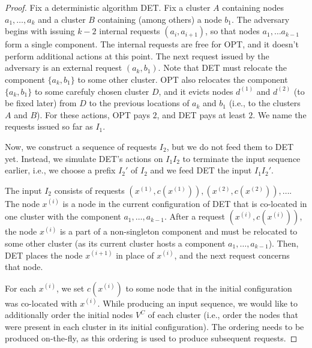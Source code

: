 \begin{proof}


  Fix a deterministic algorithm DET.
  Fix a cluster $A$ containing nodes $a_1, \ldots, a_k$ and a cluster $B$ containing (among others) a node $b_1$.
  The adversary begins with issuing $k-2$ internal requests $(a_i, a_{i+1})$, so that nodes $a_1, \ldots a_{k-1}$ form a single component.
  The internal requests are free for OPT, and it doesn't perform additional actions at this point.
  The next request issued by the adversary is an external request $(a_k, b_1)$.%
  Note that DET must relocate the component $\{a_k, b_1\}$ to some other cluster.
  OPT also relocates the component $\{a_k, b_1\}$ to some carefuly chosen cluster $D$, and it evicts nodes $d^{(1)}$ and $d^{(2)}$ (to be fixed later) from $D$ to the previous locations of $a_k$ and $b_1$ (i.e., to the clusters $A$ and $B$).
  For these actions, OPT pays $2$, and DET pays at least $2$.
  We name the requests issued so far as $I_1$.


  Now, we construct a sequence of requests $I_2$, but we do not feed them to DET yet.
  Instead, we simulate DET's actions on $I_1I_2$ to terminate the input sequence earlier, i.e., we choose a prefix $I_2'$ of $I_2$ and we feed DET the input $I_1I_2'$.


  The input $I_2$ consists of requests $(x^{(1)}, c(x^{(1)})), (x^{(2)}, c(x^{(2)})),\ldots$.
  The node $x^{(i)}$ is a node in the current configuration of DET that is co-located in one cluster with the component $a_1, \ldots, a_{k-1}$.
  After a request $(x^{(i)}, c(x^{(i)}))$, the node $x^{(i)}$ is a part of a non-singleton component and must be relocated to some other cluster (as its current cluster hosts a component $a_1, \ldots, a_{k-1}$).
  Then, DET places the node $x^{(i+1)}$ in place of $x^{(i)}$, and the next request concerns that node.

  For each $x^{(i)}$, we set $c(x^{(i)})$ to some node that in the initial configuration was co-located with $x^{(i)}$.
  While producing an input sequence, we would like to additionally order the initial nodes $V^C$ of each cluster (i.e., order the nodes that were present in each cluster in its initial configuration).
  The ordering needs to be produced on-the-fly, as this ordering is used to produce subsequent requests.
  

\end{proof}
